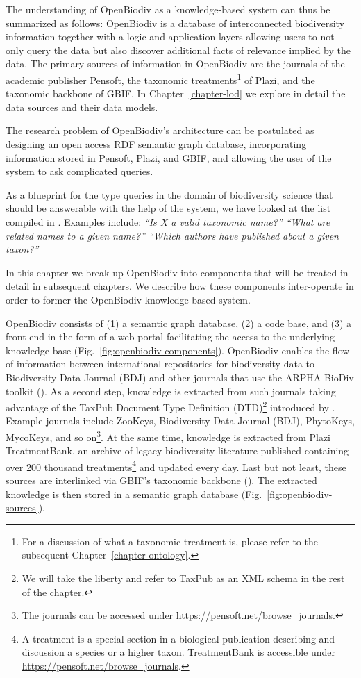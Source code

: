 The understanding of OpenBiodiv as a knowledge-based system can thus be summarized as follows: OpenBiodiv is a  database of interconnected biodiversity information together with a logic and application layers allowing users to not only query the data but also discover additional facts of relevance implied by the data. The primary sources of information in OpenBiodiv are the journals of the academic publisher Pensoft, the taxonomic treatments\footnote{For a discussion of what a taxonomic treatment is, please refer to the subsequent Chapter~\ref{chapter-ontology}.} of Plazi, and the taxonomic backbone of GBIF. In Chapter~\ref{chapter-lod} we explore in detail the data sources and their data models.

The research problem of OpenBiodiv's architecture can be postulated as designing an open access RDF semantic graph database, incorporating information stored in Pensoft, Plazi, and GBIF, and allowing the user of the system to ask complicated queries. 

As a blueprint for the type queries in the domain of biodiversity science that should be answerable with the help of the system, we have looked at the list compiled in \cite{pro-ibiosphere_competency_2013}. Examples include: \emph{``Is X a valid taxonomic name?'' ``What are related names to a given name?'' ``Which authors have published about a given taxon?''}

In this chapter we break up OpenBiodiv into components that will be treated in detail in subsequent chapters. We describe how these components inter-operate in order to former the OpenBiodiv knowledge-based system.

OpenBiodiv consists of (1) a semantic graph database, (2) a code base, and (3) a front-end in the form of a web-portal facilitating the access to the underlying knowledge base (Fig.~\ref{fig:openbiodiv-components}). OpenBiodiv enables the flow of information between international repositories for biodiversity data to Biodiversity Data Journal (BDJ) and other journals that use the ARPHA-BioDiv toolkit (\cite{penev_arpha-biodiv:_2017}). As a second step, knowledge is extracted from such journals taking advantage of the TaxPub Document Type Definition (DTD)\footnote{We will take the liberty and refer to TaxPub as an XML schema in the rest of the chapter.} introduced by \cite{catapano_taxpub:_2010}. Example journals include ZooKeys, Biodiversity Data Journal (BDJ), PhytoKeys, MycoKeys, and so on\footnote{The journals can be accessed under \url{https://pensoft.net/browse_journals}.}. At the same time, knowledge is extracted from Plazi TreatmentBank, an archive of legacy biodiversity literature published containing over 200 thousand treatments\footnote{A treatment is a special section in a biological publication describing and discussion a species or a higher taxon. TreatmentBank is accessible under \url{https://pensoft.net/browse_journals}.} and updated every day. Last but not least, these sources are interlinked via GBIF's taxonomic backbone (\cite{gbif_secretariat_gbif_2017}). The extracted knowledge is then stored in a semantic graph database (Fig.~\ref{fig:openbiodiv-sources}).

